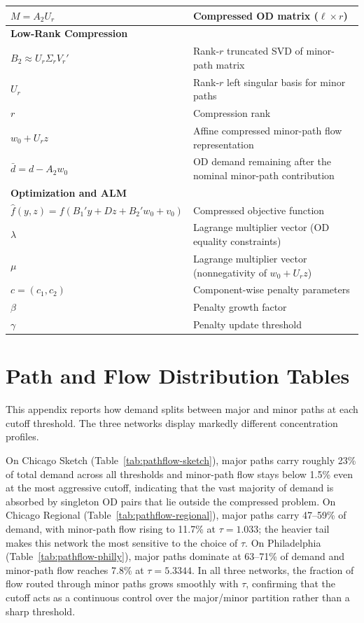 \documentclass[11pt]{article}
\begin{document}
\begin{longtable}{ll}
$M = A_2 U_r$ & Compressed OD matrix ($\ell \times r$) \\
\midrule
\multicolumn{2}{l}{\textbf{Low-Rank Compression}} \\
$B_2 \approx U_r \Sigma_r V_r'$ & Rank-$r$ truncated SVD of minor-path matrix \\
$U_r$ & Rank-$r$ left singular basis for minor paths \\
$r$ & Compression rank \\
$w_0+U_r z$ & Affine compressed minor-path flow representation \\
$\bar d=d-A_2w_0$ & OD demand remaining after the nominal minor-path contribution \\
\midrule
\multicolumn{2}{l}{\textbf{Optimization and ALM}} \\
$\hat{f}(y,z) = f(B_1'y + Dz + B_2'w_0 + v_0)$ & Compressed objective function \\
$\lambda$ & Lagrange multiplier vector (OD equality constraints) \\
$\mu$ & Lagrange multiplier vector (nonnegativity of $w_0+U_rz$) \\
$c = (c_1, c_2)$ & Component-wise penalty parameters \\
$\beta$ & Penalty growth factor \\
$\gamma$ & Penalty update threshold \\
\end{longtable}

\section{Path and Flow Distribution Tables}
\label{app:pathflow}
 
This appendix reports how demand splits between major and minor paths at each cutoff threshold. The three networks display markedly different concentration profiles. 

On Chicago Sketch (Table~\ref{tab:pathflow-sketch}), major paths carry roughly 23\% of total demand across all thresholds and minor-path flow stays below 1.5\% even at the most aggressive cutoff, indicating that the vast majority of demand is absorbed by singleton OD pairs that lie outside the compressed problem. On Chicago Regional (Table~\ref{tab:pathflow-regional}), major paths carry 47--59\% of demand, with minor-path flow rising to 11.7\% at $\tau = 1.033$; the heavier tail makes this network the most sensitive to the choice of $\tau$. On Philadelphia (Table~\ref{tab:pathflow-philly}), major paths dominate at 63--71\% of demand and minor-path flow reaches 7.8\% at $\tau = 5.3344$. In all three networks, the fraction of flow routed through minor paths grows smoothly with $\tau$, confirming that the cutoff acts as a continuous control over the major/minor partition rather than a sharp threshold.
 
\end{document}
